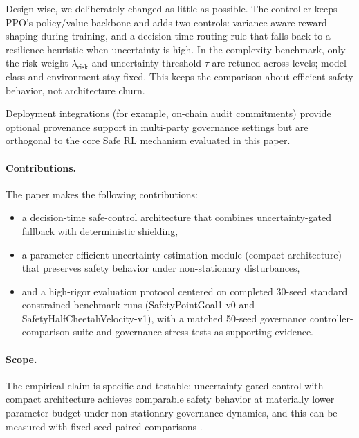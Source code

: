 Design-wise, we deliberately changed as little as possible. The controller keeps PPO's policy/value backbone and adds two controls: variance-aware reward shaping during training, and a decision-time routing rule that falls back to a resilience heuristic when uncertainty is high. In the complexity benchmark, only the risk weight $\lambda_{\mathrm{risk}}$ and uncertainty threshold $\tau$ are retuned across levels; model class and environment stay fixed. This keeps the comparison about efficient safety behavior, not architecture churn.

Deployment integrations (for example, on-chain audit commitments) provide optional provenance support in multi-party governance settings but are orthogonal to the core Safe RL mechanism evaluated in this paper.

\paragraph{Contributions.}
The paper makes the following contributions:
\begin{itemize}
    \item a decision-time safe-control architecture that combines uncertainty-gated fallback with deterministic shielding,
    \item a parameter-efficient uncertainty-estimation module (compact architecture) that preserves safety behavior under non-stationary disturbances,
    \item and a high-rigor evaluation protocol centered on completed 30-seed standard constrained-benchmark runs (SafetyPointGoal1-v0 and SafetyHalfCheetahVelocity-v1), with a matched 50-seed governance controller-comparison suite and governance stress tests as supporting evidence.
\end{itemize}

\begin{table}[htbp]
\centering

\caption{Core contribution layering: what is algorithmically novel versus efficiency support versus deployment engineering.}
\label{tab:core-contribution-layers}
\end{table}

\paragraph{Scope.}
The empirical claim is specific and testable: uncertainty-gated control with compact architecture achieves comparable safety behavior at materially lower parameter budget under non-stationary governance dynamics, and this can be measured with fixed-seed paired comparisons \citep{dror2018hitchhikers,pineau2021improving,wilson2017good}.

